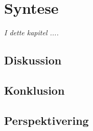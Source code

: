 \chapter{Syntese}
\textit{I dette kapitel ....}

\section{Diskussion}

\section{Konklusion}

\section{Perspektivering}
